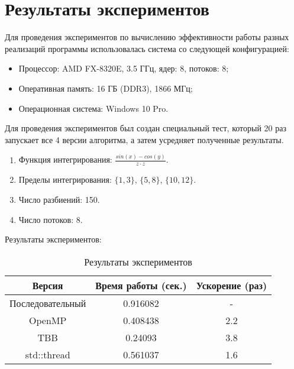 \documentclass{report}
\begin{document}
\section*{Результаты экспериментов}
Для проведения экспериментов по вычислению эффективности работы разных реализаций программы использовалась система со следующей конфигурацией:
\begin{itemize}
\item Процессор: AMD FX-8320E, 3.5 ГГц, ядер: 8, потоков: 8;
\item Оперативная память: 16 ГБ (DDR3), 1866 МГц;
\item Операционная система: Windows 10 Pro.
\end{itemize}

\par Для проведения экспериментов был создан специальный тест, который 20 раз запускает все 4 версии алгоритма, а затем усредняет полученные результаты.  
\begin{enumerate}
    \item Функция интегрирования: $\frac{sin(x) - cos(y)}{z \cdot z}$.
    \item Пределы интегрирования: $\{1, 3\}$, $\{5, 8\}$, $\{10, 12\}$.
    \item Число разбиений: 150.
    \item Число потоков: 8.
\end{enumerate}

\par Результаты экспериментов:
\begin{table}[!h]
\centering
\begin{tabular}{| c | c | c |}
\hline
Версия & Время работы (сек.) & Ускорение (раз) \\
\hline
Последовательный        & 0.916082        & -         \\
OpenMP        & 0.408438        & 2.2          \\
TBB       & 0.24093        & 3.8         \\
std::thread        & 0.561037        & 1.6           \\
\hline
\end{tabular}
\caption{Результаты экспериментов}
\end{table}

\newpage

\end{document}
